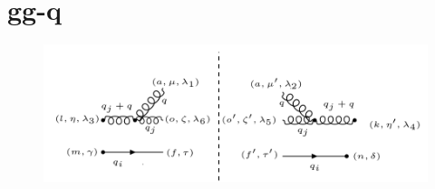 \section{gg-q}
\begin{figure}[ht!]
\centering
\includegraphics[scale=0.7]{images/QGG/ggqM2Squer.png}
\end{figure}
%
%
